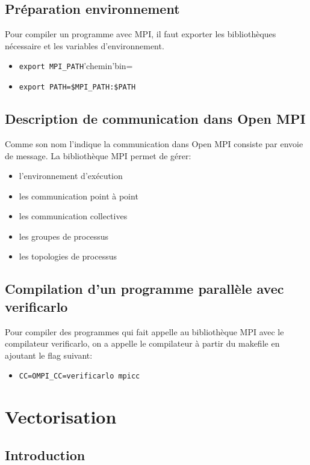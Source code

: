 \documentclass[11pt]{article}
\begin{document}
\subsection{Préparation environnement}
\label{sec:org868dce8}
Pour compiler un programme avec MPI, il faut exporter les bibliothèques nécessaire et les variables d'environnement.

\begin{itemize}
\item \texttt{export MPI\_PATH}'chemin'bin=
\item \texttt{export PATH=\$MPI\_PATH:\$PATH}
\end{itemize}
\subsection{Description de communication dans Open MPI}
\label{sec:orga0b4215}
Comme son nom l'indique la communication dans Open MPI consiste par envoie de message.
La bibliothèque MPI permet de gérer:
\begin{itemize}
\item l'environnement d'exécution
\item les communication point à point
\item les communication collectives
\item les groupes de processus
\item les topologies de processus
\end{itemize}
\subsection{Compilation d'un programme parallèle avec verificarlo}
\label{sec:orgcece1a3}
Pour compiler des programmes qui fait appelle au bibliothèque MPI avec le compilateur verificarlo, on a appelle le compilateur à partir du makefile en ajoutant le flag suivant:

\begin{itemize}
\item \texttt{CC=OMPI\_CC=verificarlo mpicc}
\end{itemize}
\section{Vectorisation}
\label{sec:org40bc469}
\subsection{Introduction}
\label{sec:orga03e7b2}
\end{document}

